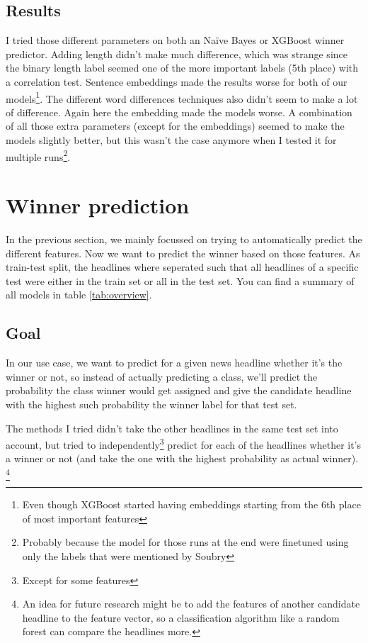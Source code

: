 \documentclass{article}
\begin{document}
\subsection{Results}
I tried those different parameters on both an Naïve Bayes or XGBoost winner predictor. Adding length didn't make much difference, which was strange since the binary length label seemed one of the more important labels (5th place) with a correlation test. Sentence embeddings made the results worse for both of our models\footnote{Even though XGBoost started having embeddings starting from the 6th place of most important features}. The different word differences techniques also didn't seem to make a lot of difference. Again here the embedding made the models worse. A combination of all those extra parameters (except for the embeddings) seemed to make the models slightly better, but this wasn't the case anymore when I tested it for multiple runs\footnote{Probably because the model for those runs at the end were finetuned using only the labels that were mentioned by Soubry}.

\section{Winner prediction}
In the previous section, we mainly focussed on trying to automatically predict the different features. Now we want to predict the winner based on those features. As train-test split, the headlines where seperated such that all headlines of a specific test were either in the train set or all in the test set. You can find a summary of all models in table \ref{tab:overview}.

\subsection{Goal}
 In our use case, we want to predict for a given news headline whether it's the winner or not, so instead of actually predicting a class, we'll predict the probability the class winner would get assigned and give the candidate headline with the highest such probability the winner label for that test set.

 The methods I tried didn't take the other headlines in the same test set into account, but tried to independently\footnote{Except for some features} predict for each of the headlines whether it's a winner or not (and take the one with the highest probability as actual winner). \footnote{An idea for future research might be to add the features of another candidate headline to the feature vector, so a classification algorithm like a random forest can compare the headlines more. }
\end{document}

